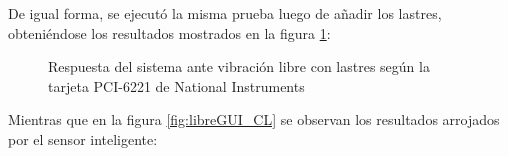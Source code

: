 De igual forma, se ejecutó la misma prueba luego de añadir los lastres, obteniéndose los resultados mostrados en la figura \ref{fig:DAQlibreCL}:
\begin{figure}[H]
    \centering
    \hfill
    \caption{Respuesta del sistema ante vibración libre con lastres según la tarjeta PCI-6221 de National Instruments}
    \label{fig:DAQlibreCL}
\end{figure}


Mientras que en la figura \ref{fig:libreGUI_CL} se observan los resultados arrojados por el sensor inteligente:

